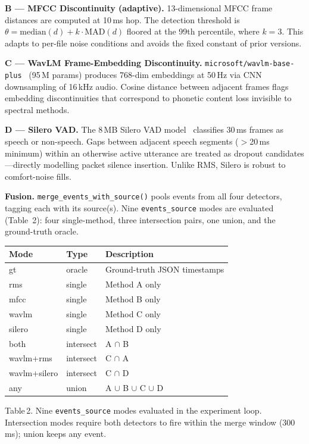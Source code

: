 \documentclass[9pt,twocolumn]{article}
\begin{document}
\noindent\textbf{B — MFCC Discontinuity (adaptive).}
13-dimensional MFCC frame distances are computed at 10\,ms hop.
The detection threshold is $\theta = \mathrm{median}(d) +
k\cdot\mathrm{MAD}(d)$ floored at the 99th percentile, where
$k{=}3$.  This adapts to per-file noise conditions and avoids the
fixed constant of prior versions.

\noindent\textbf{C — WavLM Frame-Embedding Discontinuity.}
\texttt{microsoft/wavlm-base-plus}~\cite{wavlm} (95\,M params) produces
768-dim embeddings at 50\,Hz via CNN downsampling of 16\,kHz audio.
Cosine distance between adjacent frames flags embedding discontinuities
that correspond to phonetic content loss invisible to spectral methods.

\noindent\textbf{D — Silero VAD.}
The 8\,MB Silero VAD model~\cite{silero} classifies 30\,ms frames as
speech or non-speech.  Gaps between adjacent speech segments
(${>}$20\,ms minimum) within an otherwise active utterance are treated
as dropout candidates---directly modelling packet silence insertion.
Unlike RMS, Silero is robust to comfort-noise fills.

\noindent\textbf{Fusion.}
\texttt{merge\_events\_with\_source()} pools events from all four
detectors, tagging each with its source(s).  Nine
\texttt{events\_source} modes are evaluated (Table~2): four single-method,
three intersection pairs, one union, and the ground-truth oracle.

{\footnotesize\setlength{\tabcolsep}{3pt}
\begin{tabularx}{\columnwidth}{llX}
\toprule
\textbf{Mode} & \textbf{Type} & \textbf{Description} \\
\midrule
gt             & oracle      & Ground-truth JSON timestamps \\
rms            & single      & Method A only \\
mfcc           & single      & Method B only \\
wavlm          & single      & Method C only \\
silero         & single      & Method D only \\
both           & intersect   & A $\cap$ B \\
wavlm+rms      & intersect   & C $\cap$ A \\
wavlm+silero   & intersect   & C $\cap$ D \\
any            & union       & A $\cup$ B $\cup$ C $\cup$ D \\
\bottomrule
\end{tabularx}
}
\vspace{1pt}
{\tiny Table\,2. Nine \texttt{events\_source} modes evaluated in the
experiment loop.  Intersection modes require both detectors to fire
within the merge window (300\,ms); union keeps any event.}
\end{document}
